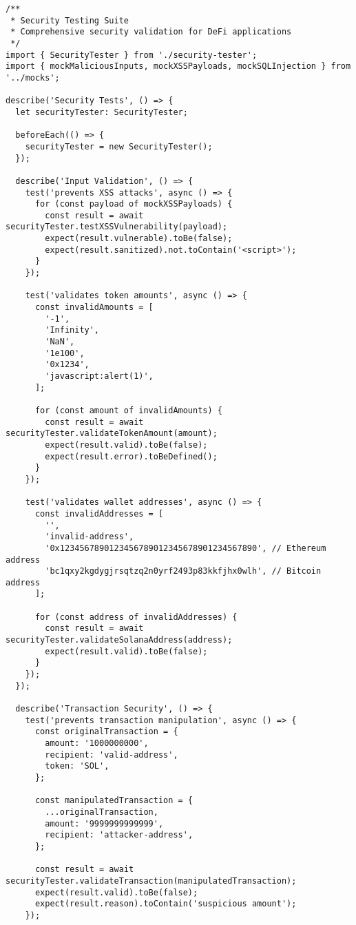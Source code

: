 \documentclass[11pt,a4paper]{article}
\begin{document}
\begin{lstlisting}[style=typescript, caption=Security Testing Suite]
/**
 * Security Testing Suite
 * Comprehensive security validation for DeFi applications
 */
import { SecurityTester } from './security-tester';
import { mockMaliciousInputs, mockXSSPayloads, mockSQLInjection } from '../mocks';

describe('Security Tests', () => {
  let securityTester: SecurityTester;

  beforeEach(() => {
    securityTester = new SecurityTester();
  });

  describe('Input Validation', () => {
    test('prevents XSS attacks', async () => {
      for (const payload of mockXSSPayloads) {
        const result = await securityTester.testXSSVulnerability(payload);
        expect(result.vulnerable).toBe(false);
        expect(result.sanitized).not.toContain('<script>');
      }
    });

    test('validates token amounts', async () => {
      const invalidAmounts = [
        '-1',
        'Infinity',
        'NaN',
        '1e100',
        '0x1234',
        'javascript:alert(1)',
      ];

      for (const amount of invalidAmounts) {
        const result = await securityTester.validateTokenAmount(amount);
        expect(result.valid).toBe(false);
        expect(result.error).toBeDefined();
      }
    });

    test('validates wallet addresses', async () => {
      const invalidAddresses = [
        '',
        'invalid-address',
        '0x1234567890123456789012345678901234567890', // Ethereum address
        'bc1qxy2kgdygjrsqtzq2n0yrf2493p83kkfjhx0wlh', // Bitcoin address
      ];

      for (const address of invalidAddresses) {
        const result = await securityTester.validateSolanaAddress(address);
        expect(result.valid).toBe(false);
      }
    });
  });

  describe('Transaction Security', () => {
    test('prevents transaction manipulation', async () => {
      const originalTransaction = {
        amount: '1000000000',
        recipient: 'valid-address',
        token: 'SOL',
      };

      const manipulatedTransaction = {
        ...originalTransaction,
        amount: '9999999999999',
        recipient: 'attacker-address',
      };

      const result = await securityTester.validateTransaction(manipulatedTransaction);
      expect(result.valid).toBe(false);
      expect(result.reason).toContain('suspicious amount');
    });


\end{lstlisting}
\end{document}
